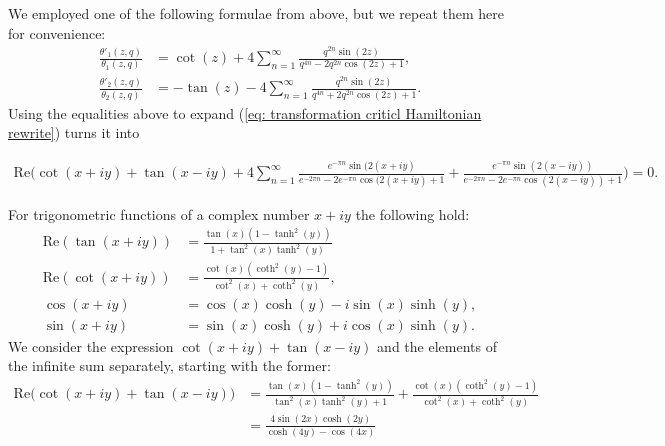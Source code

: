 \documentclass[11pt,twoside]{article}
\theoremstyle{definition}
\numberwithin{equation}{section}
\begin{document}
We employed one of the following formulae from \cite{wolfram} above, but we repeat them here for convenience:
\begin{equation}
\label{eq: theta' divided by theta}
\begin{split}
    \frac{\theta'_1(z,q)}{\theta_1(z,q)} &=\cot(z) + 4\sum\limits_{n=1}^{\infty}\frac{q^{2n}\sin(2z)}{q^{4n} - 2q^{2n}\cos(2z) + 1},\\
    \frac{\theta'_2(z,q)}{\theta_2(z,q)} &=-\tan(z) - 4\sum\limits_{n=1}^{\infty}\frac{q^{2n}\sin(2z)}{q^{4n} +2q^{2n}\cos(2z) + 1}.
\end{split}
\end{equation}
Using the equalities above to expand (\ref{eq: transformation criticl Hamiltonian rewrite}) turns it into 
\begin{tiny}
\begin{equation}
\label{eq: splitting Ham KLein}
\begin{split}
    \mathrm{Re}\Biggl( \cot(x+iy) + \tan(x-iy) + 4\sum\limits_{n=1}^{\infty} \frac{e^{-\pi n}\sin(2(x+iy)}{e^{-2\pi n } - 2e^{-\pi n }\cos(2(x+iy) + 1} +\frac{e^{-\pi n}\sin(2(x-iy))}{e^{-2\pi n } - 2e^{-\pi n }\cos(2(x-iy)) + 1} \biggr) =0.
\end{split}
\end{equation}
\end{tiny}
 For trigonometric functions of a complex number $x+ iy$ the following hold:
\begin{equation}
    \label{eq: tan and cot complex}
    \begin{split}
        \mathrm{Re}\left(\tan(x + iy)\right) &=\frac{\tan(x)(1-\tanh^2(y))}{1 + \tan^2(x)\tanh^2(y)}\\
        \mathrm{Re}\left(\cot(x + iy)\right) &= \frac{\cot(x)(\coth^2(y)-1)}{\cot^2(x) + \coth^2(y)},\\
         \cos(x + iy) &= \cos(x)\cosh(y) - i\sin(x)\sinh(y),\\
         \sin(x + iy) &= \sin(x)\cosh(y) + i\cos(x)\sinh(y).
    \end{split}
\end{equation}
We consider the expression $\cot(x+iy) + \tan(x-iy)$ and the elements of  the infinite sum separately, starting with the former:
\begin{equation}
    \label{eq: Ham crit points Klein first part}
    \begin{split}
   \mathrm{Re}\bigl(\cot(x+iy) + \tan(x-iy)\bigr) &=\frac{\tan (x) \left(1-\tanh ^2(y)\right)}{\tan ^2(x) \tanh ^2(y)+1}+\frac{\cot (x) \left(\coth ^2(y)-1\right)}{\cot ^2(x)+\coth ^2(y)}\\&=\frac{4 \sin (2 x) \cosh (2 y)}{\cosh (4 y)-\cos (4 x)}
    \end{split}
\end{equation}
\end{document}
